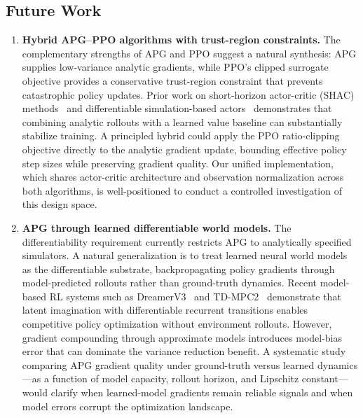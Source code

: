 \documentclass[11pt,a4paper]{article}
\begin{document}
\subsection{Future Work}
\label{sec:future}

\begin{enumerate}

  \item \textbf{Hybrid APG--PPO algorithms with trust-region constraints.}
  The complementary strengths of APG and PPO suggest a natural synthesis: APG supplies low-variance analytic gradients, while PPO's clipped surrogate objective provides a conservative trust-region constraint that prevents catastrophic policy updates. Prior work on short-horizon actor-critic (SHAC) methods~\cite{guo2023shac} and differentiable simulation-based actors~\cite{xu2022accelerated} demonstrates that combining analytic rollouts with a learned value baseline can substantially stabilize training. A principled hybrid could apply the PPO ratio-clipping objective directly to the analytic gradient update, bounding effective policy step sizes while preserving gradient quality. Our unified implementation, which shares actor-critic architecture and observation normalization across both algorithms, is well-positioned to conduct a controlled investigation of this design space.

  \item \textbf{APG through learned differentiable world models.}
  The differentiability requirement currently restricts APG to analytically specified simulators. A natural generalization is to treat learned neural world models as the differentiable substrate, backpropagating policy gradients through model-predicted rollouts rather than ground-truth dynamics. Recent model-based RL systems such as DreamerV3~\cite{hafner2023dreamerv3} and TD-MPC2~\cite{hansen2024tdmpc2} demonstrate that latent imagination with differentiable recurrent transitions enables competitive policy optimization without environment rollouts. However, gradient compounding through approximate models introduces model-bias error that can dominate the variance reduction benefit. A systematic study comparing APG gradient quality under ground-truth versus learned dynamics---as a function of model capacity, rollout horizon, and Lipschitz constant---would clarify when learned-model gradients remain reliable signals and when model errors corrupt the optimization landscape.


\end{enumerate}
\end{document}
